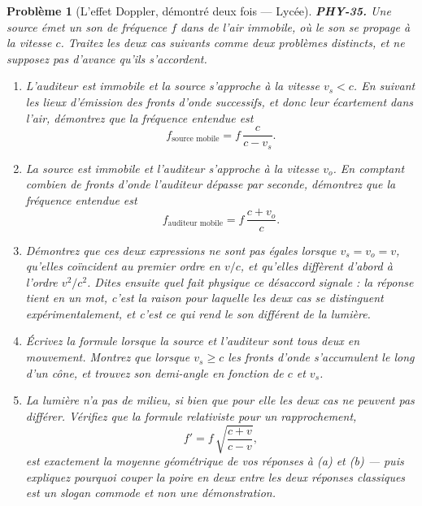 \documentclass[11pt]{article}
\newtheorem{problem}{Problème}
\begin{document}
\begin{problem}[{L'effet Doppler, démontré deux fois --- Lycée}]
\textbf{PHY-35.} Une source émet un son de fréquence $ f $ dans de l'air immobile, où le son
se propage à la vitesse $ c $. Traitez les deux cas suivants comme deux problèmes distincts, et
ne supposez pas d'avance qu'ils s'accordent.
\begin{enumerate}
\item[(a)] L'auditeur est immobile et la source s'approche à la vitesse $ v_{s} < c $. En suivant
les lieux d'émission des fronts d'onde successifs, et donc leur écartement dans l'air, démontrez
que la fréquence entendue est
\[ f_{\text{source mobile}} = f\,\frac{c}{c - v_{s}}. \]
\item[(b)] La source est immobile et l'auditeur s'approche à la vitesse $ v_{o} $. En comptant combien
de fronts d'onde l'auditeur dépasse par seconde, démontrez que la fréquence entendue est
\[ f_{\text{auditeur mobile}} = f\,\frac{c + v_{o}}{c}. \]
\item[(c)] Démontrez que ces deux expressions ne sont \textit{pas} égales lorsque $ v_{s} = v_{o} = v $,
qu'elles coïncident au premier ordre en $ v/c $, et qu'elles diffèrent d'abord à l'ordre
$ v^{2}/c^{2} $. Dites ensuite quel fait physique ce désaccord signale : la réponse tient en un
mot, c'est la raison pour laquelle les deux cas se distinguent expérimentalement, et c'est ce qui
rend le son différent de la lumière.
\item[(d)] Écrivez la formule lorsque la source et l'auditeur sont tous deux en mouvement. Montrez que
lorsque $ v_{s} \ge c $ les fronts d'onde s'accumulent le long d'un cône, et trouvez son
demi-angle en fonction de $ c $ et $ v_{s} $.
\item[(e)] La lumière n'a pas de milieu, si bien que pour elle les deux cas \textit{ne peuvent pas}
différer. Vérifiez que la formule relativiste pour un rapprochement,
\[ f' = f\,\sqrt{\frac{c+v}{c-v}}, \]
est exactement la moyenne géométrique de vos réponses à (a) et (b) --- puis expliquez pourquoi
\og{} couper la poire en deux entre les deux réponses classiques \fg{} est un slogan commode et non une
démonstration.
\end{enumerate}

\end{problem}
\end{document}
